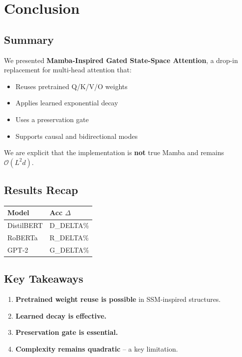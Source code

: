 \section{Conclusion}

\subsection{Summary}

We presented \textbf{Mamba-Inspired Gated State-Space Attention}, a drop-in 
replacement for multi-head attention that:
\begin{itemize}
\item Reuses pretrained Q/K/V/O weights
\item Applies learned exponential decay
\item Uses a preservation gate
\item Supports causal and bidirectional modes

\end{itemize}
We are explicit that the implementation is \textbf{not} true Mamba and remains 
$\mathcal{O}(L^2 d)$.

\subsection{Results Recap}

\begin{table}[H]
\centering
\small
\begin{tabular}{ll}
\toprule
\textbf{Model} & \textbf{Acc $\Delta$} \\
\midrule
DistilBERT & {{D\_DELTA}}\% \\
RoBERTa & {{R\_DELTA}}\% \\
GPT-2 & {{G\_DELTA}}\% \\
\bottomrule
\end{tabular}
\end{table}

\subsection{Key Takeaways}

\begin{enumerate}
\item \textbf{Pretrained weight reuse is possible} in SSM-inspired structures.
\item \textbf{Learned decay is effective.}
\item \textbf{Preservation gate is essential.}
\item \textbf{Complexity remains quadratic} -- a key limitation.

\end{enumerate}
